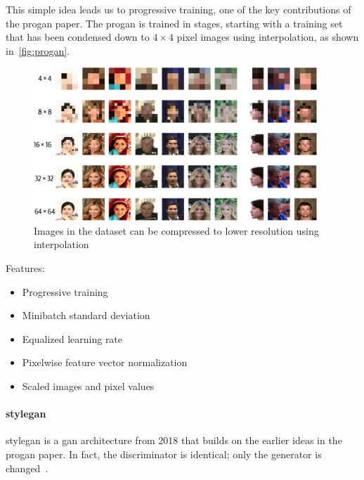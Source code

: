 This simple idea leads us to progressive training, one of the key contributions of the \gls{progan} paper.
The \gls{progan} is trained in stages, starting with a training set that has been condensed down to \( 4 \times   4 \) pixel images using interpolation, as shown in~\autoref{fig:progan}.

\begin{figure}
	\begin{center}
		\includegraphics[width=0.95\textwidth]{figures/progan}
	\end{center}
	\caption{Images in the dataset can be compressed to lower resolution using interpolation}\label{fig:progan}
\end{figure}

Features:

\begin{itemize}
	\item Progressive training
	\item Minibatch standard deviation
	\item Equalized learning rate
	\item Pixelwise feature vector normalization
	\item Scaled images and pixel values
\end{itemize}

\paragraph{\gls{stylegan}~\cite{karras2018tyle}}

\gls{stylegan} is a \gls{gan} architecture from 2018 that builds on the earlier ideas in the \gls{progan} paper.
In fact, the discriminator is identical; only the generator is changed~.

